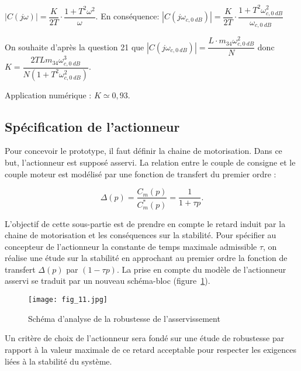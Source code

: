 \ifprof
\begin{corrige}
$\left| C\left(j\omega\right)\right|= \dfrac{K}{2T}\cdot \dfrac{1+T^2\omega^2}{\omega}$. En conséquence:
$\left| C\left(j\omega_{c,\SI{0}{dB}}\right)\right| = \dfrac{K}{2T}\cdot \dfrac{1+T^2\omega_{c,\SI{0}{dB}}^2}{\omega_{c,\SI{0}{dB}}}$


On souhaite d'après la question 21 que $\left| C\left(j\omega_{c,\SI{0}{dB}}\right)\right| = \dfrac{L\cdot m_{34}\omega_{c,\SI{0}{dB}}^2}{N}$ donc  $\boxed{K=\dfrac{2TLm_{34}\omega_{c,\SI{0}{dB}}^3}{N(1+T^2\omega_{c,\SI{0}{dB}}^2)}}$.

Application numérique : $\boxed{K \simeq 0,93}$.

\end{corrige}
\else
\fi

\subsection{Spécification de l'actionneur}
\ifprof
\else
Pour concevoir le prototype, il faut définir la chaine de motorisation. Dans ce but, l'actionneur est supposé asservi. La relation entre le couple de consigne et le couple moteur est modélisé par une fonction de transfert du premier ordre :

$$
\Delta(p)=\frac{C_{m}(p)}{C_{m}^{*}(p)}=\frac{1}{1+\tau p} .
$$

L'objectif de cette sous-partie est de prendre en compte le retard induit par la chaine de motorisation et les conséquences sur la stabilité. Pour spécifier au concepteur de l'actionneur la constante de temps maximale admissible $\tau$, on réalise une étude sur la stabilité en approchant au premier ordre la fonction de transfert $\Delta(p)$ par $(1-\tau p)$. La prise en compte du modèle de l'actionneur asservi se traduit par un nouveau schéma-bloc (figure~\ref{fig:11}).


\begin{figure}[H]
\centering
\texttt{[image: fig\_11.jpg]}
\caption{\label{fig:11} Schéma d'analyse de la robustesse de l'asservissement}
\end{figure}


Un critère de choix de l'actionneur sera fondé sur une étude de robustesse par rapport à la valeur maximale de ce retard acceptable pour respecter les exigences liées à la stabilité du système.

